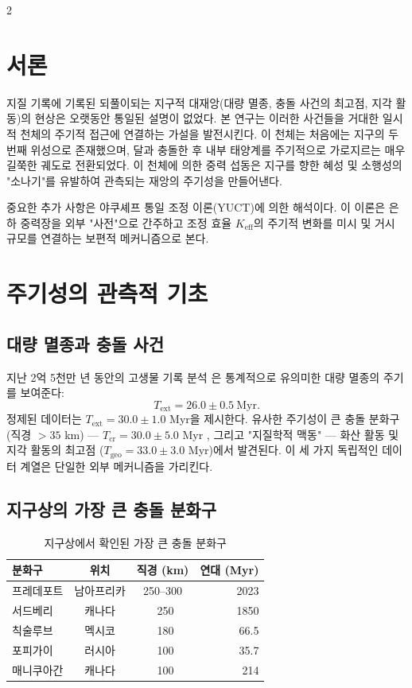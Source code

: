 \documentclass[12pt,a4paper]{article}
\begin{document}
	\begin{multicols}{2}
		
		\section{서론}
		지질 기록에 기록된 되풀이되는 지구적 대재앙(대량 멸종, 충돌 사건의 최고점, 지각 활동)의 현상은 오랫동안 통일된 설명이 없었다. 본 연구는 이러한 사건들을 거대한 일시적 천체의 주기적 접근에 연결하는 가설을 발전시킨다. 이 천체는 처음에는 지구의 두 번째 위성으로 존재했으며, 달과 충돌한 후 내부 태양계를 주기적으로 가로지르는 매우 길쭉한 궤도로 전환되었다. 이 천체에 의한 중력 섭동은 지구를 향한 혜성 및 소행성의 "소나기"를 유발하여 관측되는 재앙의 주기성을 만들어낸다.
		
		중요한 추가 사항은 야쿠셰프 통일 조정 이론(YUCT)에 의한 해석이다. 이 이론은 은하 중력장을 외부 "사전"으로 간주하고 조정 효율 \(K_{\mathrm{eff}}\)의 주기적 변화를 미시 및 거시 규모를 연결하는 보편적 메커니즘으로 본다.
		
		\section{주기성의 관측적 기초}
		\subsection{대량 멸종과 충돌 사건}
		지난 2억 5천만 년 동안의 고생물 기록 분석 \cite{Raup1984, Melott2010}은 통계적으로 유의미한 대량 멸종의 주기를 보여준다:
		\[
		T_{\text{ext}} = 26.0 \pm 0.5\ \text{Myr}.
		\]
		정제된 데이터는 \(T_{\text{ext}} = 30.0 \pm 1.0\) Myr을 제시한다. 유사한 주기성이 큰 충돌 분화구(직경 \(>35\) km) — \(T_{\text{cr}} = 30.0 \pm 5.0\) Myr \cite{RampinoStothers1984}, 그리고 "지질학적 맥동" — 화산 활동 및 지각 활동의 최고점 (\(T_{\text{geo}} = 33.0 \pm 3.0\) Myr)에서 발견된다. 이 세 가지 독립적인 데이터 계열은 단일한 외부 메커니즘을 가리킨다.
		
		\subsection{지구상의 가장 큰 충돌 분화구}
		\begin{table}[htbp]
			\centering
			\caption{지구상에서 확인된 가장 큰 충돌 분화구}
			\label{tab:craters}
			\footnotesize
			\begin{tabular}{lccr}
				\toprule
				\textbf{분화구} & \textbf{위치} & \textbf{직경 (km)} & \textbf{연대 (Myr)} \\
				\midrule
				프레데포트 & 남아프리카 & 250–300 & 2023 \\
				서드베리 & 캐나다 & ~250 & 1850 \\
				칙술루브 & 멕시코 & ~180 & 66.5 \\
				포피가이 & 러시아 & ~100 & 35.7 \\
				매니쿠아간 & 캐나다 & ~100 & 214 \\
				\bottomrule
			\end{tabular}
		\end{table}
		

\end{multicols}
\end{document}
